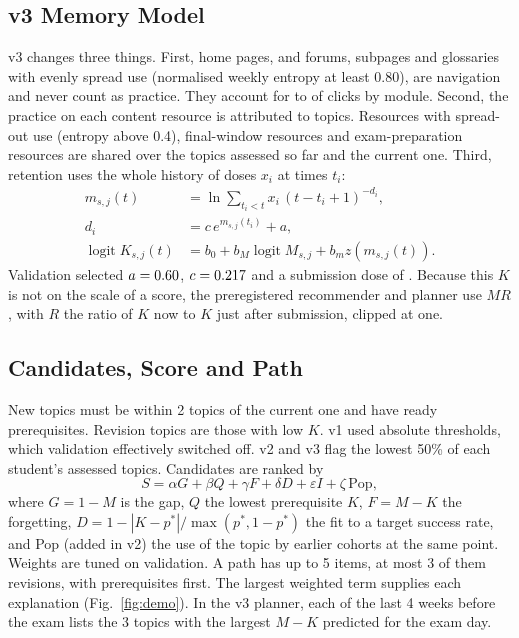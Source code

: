 \documentclass[conference]{IEEEtran}
\begin{document}
\subsection{v3 Memory Model}
v3 changes three things. First, home pages, and forums, subpages and glossaries with evenly spread use (normalised weekly entropy at least 0.80), are navigation and never count as practice. They account for \NavLow{} to \NavHigh{} of clicks by module. Second, the practice on each content resource is attributed to topics. Resources with spread-out use (entropy above 0.4), final-window resources and exam-preparation resources are shared over the topics assessed so far and the current one. Third, retention uses the whole history of doses $x_i$ at times $t_i$:
\begin{align}
m_{s,j}(t) &= \ln\textstyle\sum_{t_i<t} x_i\,(t-t_i+1)^{-d_i},\\
d_i &= c\,e^{m_{s,j}(t_i)}+a,\\
\operatorname{logit}K_{s,j}(t) &= b_0+b_M\operatorname{logit}M_{s,j}+b_m z(m_{s,j}(t)).
\end{align}
Validation selected $a=\mbox{0.60}$, $c=\mbox{0.217}$ and a submission dose of \DoseSub. Because this $K$ is not on the scale of a score, the preregistered recommender and planner use $MR$, with $R$ the ratio of $K$ now to $K$ just after submission, clipped at one.

\subsection{Candidates, Score and Path}
New topics must be within 2 topics of the current one and have ready prerequisites. Revision topics are those with low $K$. v1 used absolute thresholds, which validation effectively switched off. v2 and v3 flag the lowest 50\% of each student's assessed topics. Candidates are ranked by
\begin{equation}
S=\alpha G+\beta Q+\gamma F+\delta D+\varepsilon I+\zeta\,\mathrm{Pop},
\end{equation}
where $G=1-M$ is the gap, $Q$ the lowest prerequisite $K$, $F=M-K$ the forgetting, $D=1-|K-p^*|/\max(p^*,1-p^*)$ the fit to a target success rate, and Pop (added in v2) the use of the topic by earlier cohorts at the same point. Weights are tuned on validation. A path has up to 5 items, at most 3 of them revisions, with prerequisites first. The largest weighted term supplies each explanation (Fig.~\ref{fig:demo}). In the v3 planner, each of the last 4 weeks before the exam lists the 3 topics with the largest $M-K$ predicted for the exam day.
\end{document}
